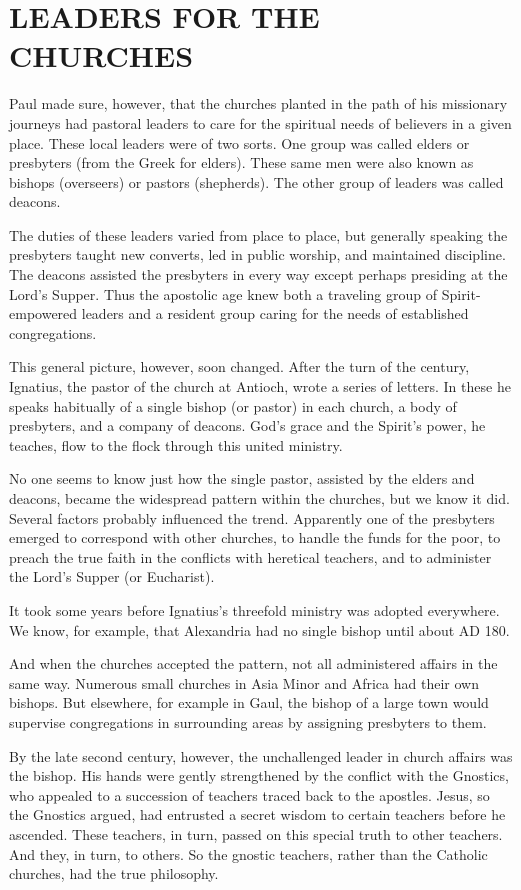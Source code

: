 \section{LEADERS FOR THE CHURCHES}

Paul made sure, however, that the churches planted in the path of his missionary journeys had
pastoral leaders to care for the spiritual needs of believers in a given place. These local leaders
were of two sorts. One group was called elders or presbyters (from the Greek for elders). These same
men were also known as bishops (overseers) or pastors (shepherds). The other group of leaders was
called deacons.

The duties of these leaders varied from place to place, but generally speaking the presbyters taught
new converts, led in public worship, and maintained discipline. The deacons assisted the presbyters
in every way except perhaps presiding at the Lord’s Supper. Thus the apostolic age knew both a
traveling group of Spirit-empowered leaders and a resident group caring for the needs of established
congregations.

This general picture, however, soon changed. After the turn of the century, Ignatius, the pastor of
the church at Antioch, wrote a series of letters. In these he speaks habitually of a single bishop
(or pastor) in each church, a body of presbyters, and a company of deacons. God’s grace and the
Spirit’s power, he teaches, flow to the flock through this united ministry.

No one seems to know just how the single pastor, assisted by the elders and deacons, became the
widespread pattern within the churches, but we know it did. Several factors probably influenced the
trend. Apparently one of the presbyters emerged to correspond with other churches, to handle the
funds for the poor, to preach the true faith in the conflicts with heretical teachers, and to
administer the Lord’s Supper (or Eucharist).

It took some years before Ignatius’s threefold ministry was adopted everywhere. We know, for
example, that Alexandria had no single bishop until about AD 180.

And when the churches accepted the pattern, not all administered affairs in the same way. Numerous
small churches in Asia Minor and Africa had their own bishops. But elsewhere, for example in Gaul,
the bishop of a large town would supervise congregations in surrounding areas by assigning
presbyters to them.

By the late second century, however, the unchallenged leader in church affairs was the bishop. His
hands were gently strengthened by the conflict with the Gnostics, who appealed to a succession of
teachers traced back to the apostles. Jesus, so the Gnostics argued, had entrusted a secret wisdom
to certain teachers before he ascended. These teachers, in turn, passed on this special truth to
other teachers. And they, in turn, to others. So the gnostic teachers, rather than the Catholic
churches, had the true philosophy.

